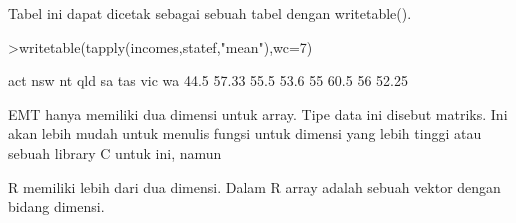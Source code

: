 \documentclass[a4paper,10pt]{article}
\begin{document}
\begin{eulernotebook}
\begin{eulercomment}
\begin{eulercomment}
\begin{eulercomment}
\begin{eulercomment}
\begin{eulercomment}
Tabel ini dapat dicetak sebagai sebuah tabel dengan writetable().
\end{eulercomment}
\begin{eulerprompt}
>writetable(tapply(incomes,statef,"mean"),wc=7)
\end{eulerprompt}
\begin{euleroutput}
      act    nsw     nt    qld     sa    tas    vic     wa
     44.5  57.33   55.5   53.6     55   60.5     56  52.25
\end{euleroutput}
\begin{eulercomment}
EMT hanya memiliki dua dimensi untuk array. Tipe data ini disebut
matriks. Ini akan lebih mudah untuk menulis fungsi untuk dimensi yang
lebih tinggi atau sebuah library C untuk ini, namun

R memiliki lebih dari dua dimensi. Dalam R array adalah sebuah vektor
dengan bidang dimensi.


\end{eulercomment}
\end{eulercomment}
\end{eulercomment}
\end{eulercomment}
\end{eulercomment}
\end{eulernotebook}
\end{document}
